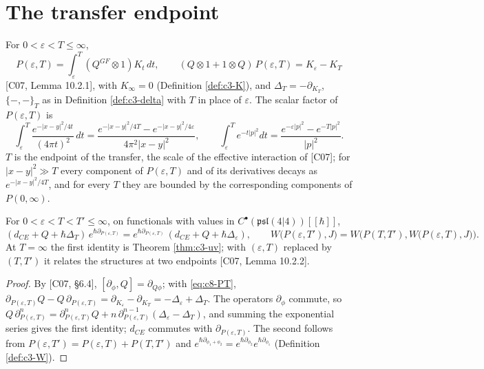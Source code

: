 \section{The transfer endpoint}

\begin{definition}
\label{def:c8-PT}
For $0<\varepsilon<T\le\infty$,
\begin{equation}
P(\varepsilon,T)=\int_\varepsilon^T(Q^{GF}\otimes1)K_t\,dt,\qquad (Q\otimes1+1\otimes Q)\,P(\varepsilon,T)=K_\varepsilon-K_T
\label{eq:c8-PT}
\end{equation}
[C07, Lemma 10.2.1], with $K_\infty=0$ (Definition \ref{def:c3-K}), and $\Delta_T=-\partial_{K_T}$, $\{-,-\}_T$ as in Definition \ref{def:c3-delta} with $T$ in place of $\varepsilon$. The scalar factor of $P(\varepsilon,T)$ is
\[
\int_\varepsilon^T\frac{e^{-|x-y|^2/4t}}{(4\pi t)^2}\,dt=\frac{e^{-|x-y|^2/4T}-e^{-|x-y|^2/4\varepsilon}}{4\pi^2|x-y|^2},\qquad \int_\varepsilon^Te^{-t|p|^2}dt=\frac{e^{-\varepsilon|p|^2}-e^{-T|p|^2}}{|p|^2}.
\]
$T$ is the endpoint of the transfer, the scale of the effective interaction of [C07]; for $|x-y|^2\gg T$ every component of $P(\varepsilon,T)$ and of its derivatives decays as $e^{-|x-y|^2/4T}$, and for every $T$ they are bounded by the corresponding components of $P(0,\infty)$.
\end{definition}

\begin{lemma}
\label{lem:c8-transfer}
For $0<\varepsilon<T<T'\le\infty$, on functionals with values in $C^\bullet(\mathfrak{psl}(4|4))[[\hbar]]$,
\begin{equation}
(d_{CE}+Q+\hbar\Delta_T)\,e^{\hbar\partial_{P(\varepsilon,T)}}=e^{\hbar\partial_{P(\varepsilon,T)}}\,(d_{CE}+Q+\hbar\Delta_\varepsilon),\qquad W\big(P(\varepsilon,T'),J\big)=W\Big(P(T,T'),W\big(P(\varepsilon,T),J\big)\Big).
\label{eq:c8-transfer}
\end{equation}
At $T=\infty$ the first identity is Theorem \ref{thm:c3-uv}; with $(\varepsilon,T)$ replaced by $(T,T')$ it relates the structures at two endpoints [C07, Lemma 10.2.2].
\end{lemma}

\begin{proof}
By [C07, §6.4], $[\partial_\phi,Q]=\partial_{Q\phi}$; with \eqref{eq:c8-PT}, $\partial_{P(\varepsilon,T)}Q-Q\,\partial_{P(\varepsilon,T)}=\partial_{K_\varepsilon}-\partial_{K_T}=-\Delta_\varepsilon+\Delta_T$. The operators $\partial_\phi$ commute, so $Q\,\partial_{P(\varepsilon,T)}^n=\partial_{P(\varepsilon,T)}^nQ+n\,\partial_{P(\varepsilon,T)}^{n-1}(\Delta_\varepsilon-\Delta_T)$, and summing the exponential series gives the first identity; $d_{CE}$ commutes with $\partial_{P(\varepsilon,T)}$. The second follows from $P(\varepsilon,T')=P(\varepsilon,T)+P(T,T')$ and $e^{\hbar\partial_{\phi_1+\phi_2}}=e^{\hbar\partial_{\phi_2}}e^{\hbar\partial_{\phi_1}}$ (Definition \ref{def:c3-W}).
\end{proof}

